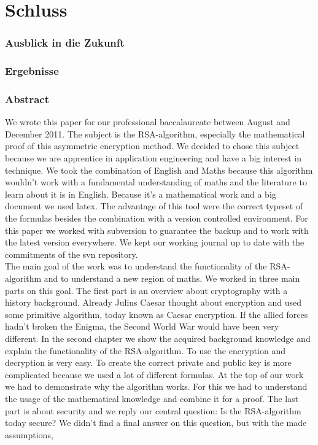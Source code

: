\part{Schluss}
\section{Ausblick in die Zukunft}
\section{Ergebnisse}
\section{Abstract}
We wrote this paper for our professional baccalaureate between August and December 2011. The subject is the RSA-algorithm, especially the mathematical proof of this asymmetric encryption method. We decided to chose this subject because we are apprentice in application engineering and have a big interest in technique. We took the combination of English and Maths because this algorithm wouldn't work with a fundamental understanding of maths and the literature to learn about it is in English. Because it's a mathematical work and a big document we used latex. The advantage of this tool were the correct typeset of the formulas besides the combination with a version controlled environment. For this paper we worked with subversion to guarantee the backup and to work with the latest version everywhere. We kept our working journal up to date with the commitments of the svn repository.  \\
The main goal of the work was to understand the functionality of the RSA-algorithm and to understand a new region of maths. We worked in three main parts on this goal. The first part is an overview about cryptography with a history background. Already Julius Caesar thought about encryption and used some primitive algorithm, today known as Caesar encryption. If the allied forces hadn't broken the Enigma, the Second World War would have been very different. %
In the second chapter we show the acquired background knowledge and explain the functionality of the RSA-algorithm. To use the encryption and decryption is very easy. To create the correct private and public key is more complicated because we used a lot of different formulas. At the top of our work we had to demonstrate why the algorithm works. For this we had to understand the usage of the mathematical knowledge and combine it for a proof. 
The last part is about security and we reply our central question: Is the RSA-algorithm today secure? We didn't find a final answer on this question, but with the made assumptions, %

